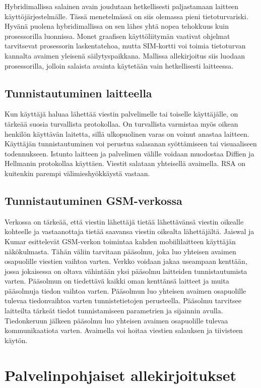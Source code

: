 \documentclass[finnish]{tktltiki2}
\theoremstyle{definition}
\theoremstyle{remark}
\begin{document}
Hybridimallissa salainen avain joudutaan hetkellisesti paljastamaan laitteen käyttöjärjestelmälle. Tässä menetelmässä on siis olemassa pieni tietoturvariski. Hyvänä puolena hybridimallissa on sen lähes yhtä nopea tehokkuus kuin prosessorilla luonnissa. Monet graafisen käyttöliitymän vaativat ohjelmat tarvitsevat prosessorin laskentatehoa, mutta SIM-kortti voi toimia tietoturvan kannalta avaimen yleisenä säilytyspaikkana. Mallissa allekirjoitus siis luodaan prosessorilla, jolloin salaista avainta käytetään vain hetkellisesti laitteessa.


\subsection{Tunnistautuminen laitteella}
Kun käyttäjä haluaa lähettää viestin palvelimelle tai toiselle käyttäjälle, on tärkeää suosia turvallista protokollaa. On turvallista varmistaa myös oikean henkilön käyttävän laitetta, sillä ulkopuolinen varas on voinut anastaa laitteen. Käyttäjän tunnistautuminen voi perustua salasanan syöttämiseen tai visuaaliseen todennukseen. Istunto laitteen ja palvelimen välille voidaan muodostaa Diffien ja Hellmanin protokollaa käyttäen. Viestit salataan yhteisellä avaimella. RSA on kuitenkin parempi välimieshyökkäystä vastaan. 

\subsection{Tunnistautuminen GSM-verkossa}

Verkossa on tärkeää, että viestin lähettäjä tietää lähettävänsä viestin oikealle kohteelle ja vastaanottaja tietää saavansa viestin oikealta lähettäjältä. Jaiswal ja Kumar \cite{cell} esittelevät GSM-verkon toimintaa kahden mobiililaitteen käyttäjän näkökulmasta. Tähän väliin tarvitaan pääsolmu, joka luo yhteisen avaimen osapuolille viestien vaihtoa varten. Verkko voidaan jakaa useampaan kenttään, jossa jokaisessa on oltava vähintään yksi pääsolmu laitteiden tunnistautumista varten. Pääsolmun on tiedettävä kaikki oman kenttänsä laitteet ja muita pääsolmuja tiedon vaihtoa varten. Pääsolmun luo yhteisen avaimen osapuolille tulevaa tiedonvaihtoa varten tunnistetietojen perusteella. Pääsolmu tarvitsee laitteilta tärkeät tiedot tunnistamiseen parametrien ja sijainnin avulla. Tiedonkeruun jälkeen pääsolmu luo yhteisen avaimen osapuolille tulevaa kommunikaatiota varten. Avaimella voi hoitaa viestien salauksen ja tiivisteen käytön.

\section{Palvelinpohjaiset allekirjoitukset}
\end{document}
